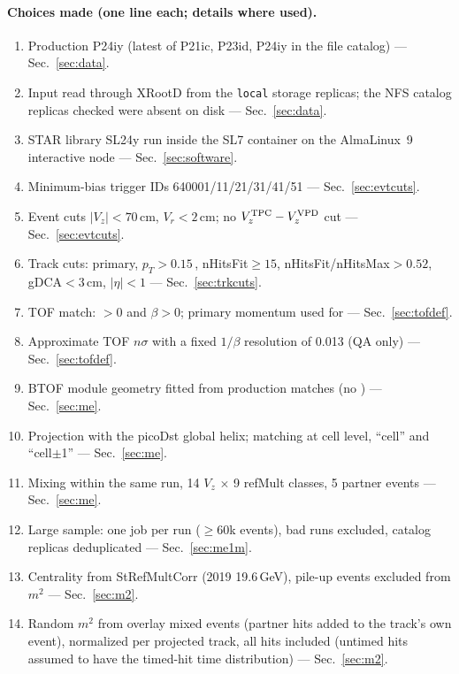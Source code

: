 \paragraph{Choices made (one line each; details where used).}
\begin{enumerate}
\item Production P24iy (latest of P21ic, P23id, P24iy in the file catalog) --- Sec.~\ref{sec:data}.
\item Input read through XRootD from the \texttt{local} storage replicas; the NFS catalog replicas
  checked were absent on disk --- Sec.~\ref{sec:data}.
\item STAR library SL24y run inside the SL7 container on the AlmaLinux~9 interactive node --- Sec.~\ref{sec:software}.
\item Minimum-bias trigger IDs 640001/11/21/31/41/51 --- Sec.~\ref{sec:evtcuts}.
\item Event cuts $|V_z|<70$\,cm, $V_r<2$\,cm; no $V_z^{\rm TPC}-V_z^{\rm VPD}$ cut --- Sec.~\ref{sec:evtcuts}.
\item Track cuts: primary, $p_T>0.15$\,\GeVc, nHitsFit$\ge15$, nHitsFit/nHitsMax$>0.52$, gDCA$<3$\,cm, $|\eta|<1$ --- Sec.~\ref{sec:trkcuts}.
\item TOF match: $>0$ and $\beta>0$; primary momentum used for \mtwo --- Sec.~\ref{sec:tofdef}.
\item Approximate TOF $n\sigma$ with a fixed $1/\beta$ resolution of 0.013 (QA only) --- Sec.~\ref{sec:tofdef}.
\item BTOF module geometry fitted from production matches (no ) --- Sec.~\ref{sec:me}.
\item Projection with the picoDst global helix; matching at cell level, ``cell'' and ``cell$\pm$1'' --- Sec.~\ref{sec:me}.
\item Mixing within the same run, 14 $V_z$ $\times$ 9 refMult classes, 5 partner events --- Sec.~\ref{sec:me}.
\item Large sample: one job per run ($\ge$60k events), bad runs excluded, catalog replicas deduplicated --- Sec.~\ref{sec:me1m}.
\item Centrality from StRefMultCorr (2019 19.6\,GeV), pile-up events excluded from $m^2$ --- Sec.~\ref{sec:m2}.
\item Random $m^2$ from overlay mixed events (partner hits added to the track's own event), normalized per projected
  track, all hits included (untimed hits assumed to have the timed-hit time distribution) --- Sec.~\ref{sec:m2}.
\end{enumerate}
